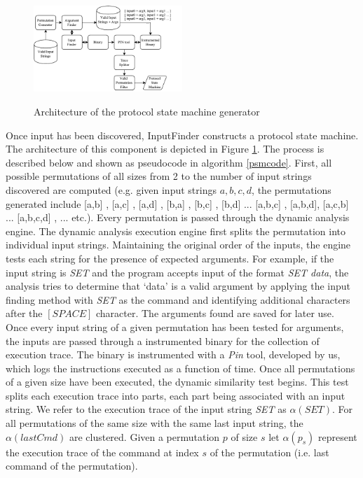 \documentclass{acm_proc_article-sp}
\def \tool {InputFinder}
\begin{document}
\begin{figure}[h!]
\caption{Architecture of the protocol state machine generator}
\centering
\includegraphics[width=0.5\textwidth]{psmarch}
\label{fig:psm_arch}
\end{figure}

Once input has been discovered, \tool{} constructs a protocol state machine.
The architecture of this component is depicted in Figure \ref{fig:psm_arch}.
The process is described below and shown as pseudocode in algorithm \ref{psmcode}.
First, all possible permutations of all sizes from 2 to the number of input strings discovered are computed (e.g. given input strings $a,b,c,d$, the permutations generated include [a,b] , [a,c] , [a,d] , [b,a] , [b,c] , [b,d] ... [a,b,c] , [a,b,d], [a,c,b] ... [a,b,c,d] , ...  etc.).
Every permutation is passed through the dynamic analysis engine.
The dynamic analysis execution engine first splits the permutation into individual input strings.
Maintaining the original order of the inputs, the engine tests each string for the presence of expected arguments.
For example, if the input string is \textit{SET} and the program accepts input of the format \textit{SET data}, the analysis tries to determine that `data' is a valid argument by applying the input finding method with \textit{SET} as the command and identifying additional characters after the $[SPACE]$ character.
The arguments found are saved for later use.
Once every input string of a given permutation has been tested for arguments, the inputs are passed through a instrumented binary for the collection of execution trace.
The binary is instrumented with a \textit{Pin} tool, developed by us, which logs the instructions executed as a function of time.
Once all permutations of a given size have been executed, the dynamic similarity test begins.
This test splits each execution trace into parts, each part being associated with an input string.
We refer to the execution trace of the input string \textit{SET} as $\alpha(SET)$.
For all permutations of the same size with the same last input string, the $\alpha(lastCmd)$ are clustered.
Given a permutation $p$ of size $s$ let $\alpha(p_s)$ represent the execution trace of the command at index $s$ of the permutation (i.e. last command of the permutation).
\end{document}
